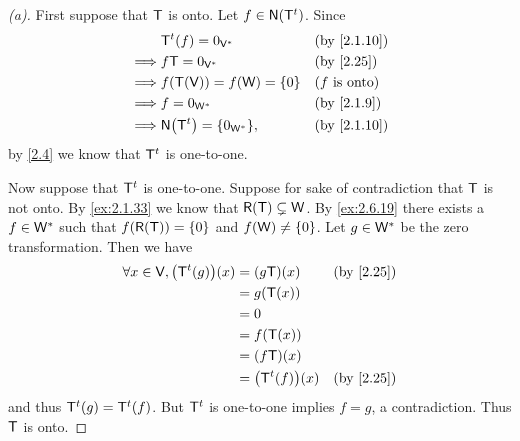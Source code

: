 \begin{proof}[(a)]
  First suppose that \(\mathsf{T}\) is onto.
  Let \(f \in \ns{\tp{\T}}\).
  Since
  \begin{align*}
             & \tp{\T}(f) = 0_{\V^*}          &  & \by{2.1.10}            \\
    \implies & f \T = 0_{\V^*}                &  & \by{2.25}              \\
    \implies & f(\T(\V)) = f(\W) = \set{0}    &  & \text{(\(f\) is onto)} \\
    \implies & f = 0_{\W^*}                   &  & \by{2.1.9}             \\
    \implies & \ns{\tp{\T}} = \set{0_{\W^*}}, &  & \by{2.1.10}
  \end{align*}
  by \cref{2.4} we know that \({\mathsf{T}}^{t}\) is one-to-one.

  Now suppose that \({\mathsf{T}}^{t}\) is one-to-one.
  Suppose for sake of contradiction that \(\mathsf{T}\) is not onto.
  By \cref{ex:2.1.33} we know that \(\rg{\T} \subsetneq \W\).
  By \cref{ex:2.6.19} there exists a \(f \in \mathsf{W}^*\) such that \(f(\rg{\T}) = \set{0}\) and \(f(\mathsf{W}) \neq \left\lbrace0\right\rbrace\).
  Let \(g \in \mathsf{W}^*\) be the zero transformation.
  Then we have
  \begin{align*}
    \forall x \in \V, \pa{\tp{\T}(g)}(x) & = (g \T)(x)          &  & \by{2.25} \\
                                         & = g(\T(x))                          \\
                                         & = 0                                 \\
                                         & = f(\T(x))                          \\
                                         & = (f \T)(x)                         \\
                                         & = \pa{\tp{\T}(f)}(x) &  & \by{2.25}
  \end{align*}
  and thus \({\mathsf{T}}^{t}(g) = {\mathsf{T}}^{t}(f)\).
  But \({\mathsf{T}}^{t}\) is one-to-one implies \(f = g\), a contradiction.
  Thus \(\mathsf{T}\) is onto.
\end{proof}

